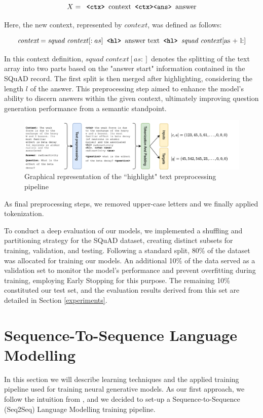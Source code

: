 \documentclass{article}
\begin{document}
\[ X = \textbf{\texttt{ <ctx> }} \text{context} \textbf{\texttt{ <ctx>}} \texttt{<ans> } \text{answer}\]

Here, the new context, represented by $context$, was defined as follows:

\[ \textit{context} = \text{\textit{squad context}}[:as] \textbf{\texttt{ <hl> }} \text{answer text} \textbf{\texttt{ <hl> }} \text{\textit{squad context}[as + l:]} \]

In this context definition, $\textit{squad context}[as:]$ denotes the splitting of the text array into two parts based on the "answer start" information contained in the SQuAD record. The first split is then merged after highlighting, considering the length $l$ of the answer. This preprocessing step aimed to enhance the model's ability to discern answers within the given context, ultimately improving question generation performance from a semantic standpoint.
\begin{figure}
    \centering
    \includegraphics[width=\textwidth]{assets/training-pipeline.drawio.png}
    \caption{Graphical representation of the ``highlight" text preprocessing pipeline}
    \label{fig:preprocessing}
\end{figure}
As final preprocessing steps, we removed upper-case letters and we finally applied tokenization.

To conduct a deep evaluation of our models, we implemented a shuffling and partitioning strategy for the SQuAD dataset, creating distinct subsets for training, validation, and testing. Following a standard split, 80\% of the dataset was allocated for training our models. An additional 10\% of the data served as a validation set to monitor the model's performance and prevent overfitting during training, employing Early Stopping for this purpose. The remaining 10\% constituted our test set, and the evaluation results derived from this set are detailed in Section \ref{experiments}.

\section{Sequence-To-Sequence Language Modelling}
In this section we will describe learning techniques and the applied training pipeline used for training neural generative models. As our first approach, we follow the intuition from \cite{chan-fan-2019-recurrent}, and we decided to set-up a Sequence-to-Sequence (Seq2Seq) Language Modelling training pipeline. 
\end{document}
